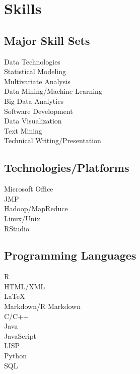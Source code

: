 \documentclass[letterpaper]{deedy-resume} %
\begin{document}
\begin{minipage}[t]{0.35\textwidth}

\section{Skills}
\subsection{Major Skill Sets}
Data Technologies\\
Statistical Modeling\\
Multivariate Analysis\\
Data Mining/Machine Learning\\
Big Data Analytics\\
Software Development\\
Data Visualization\\
Text Mining\\
Technical Writing/Presentation

\sectionspace %
\vspace{5pt}
\subsection{Technologies/Platforms}
Microsoft Office\\
JMP\\
Hadoop/MapReduce\\
Linux/Unix\\
RStudio\\

\sectionspace %
\vspace{5pt}
\subsection{Programming Languages}
R\\
HTML/XML\\
\LaTeX\\
Markdown/R Markdown\\
\vspace{5pt}
C/C++\\
Java\\
JavaScript\\
LISP\\
Python\\
SQL\\



\end{minipage} %
\end{document}
